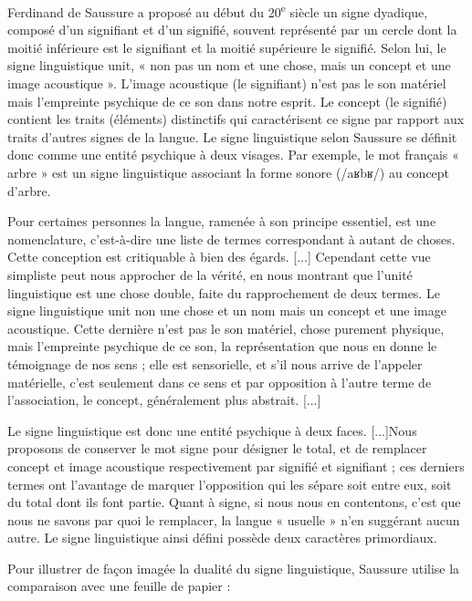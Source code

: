 Ferdinand de Saussure a proposé au début du 20\textsuperscript{e} siècle un signe dyadique, composé d’un signifiant et d’un signifié, souvent représenté par un cercle dont la moitié inférieure est le signifiant et la moitié supérieure le signifié. Selon lui, le signe linguistique unit, « non pas un nom et une chose, mais un concept et une image acoustique ». L’image acoustique (le signifiant) n’est pas le son matériel mais l’empreinte psychique de ce son dans notre esprit. Le concept (le signifié) contient
 les traits (éléments) distinctifs qui caractérisent ce signe par rapport aux traits d’autres signes de la langue. Le signe linguistique selon Saussure se définit donc comme une entité psychique à deux visages. Par exemple, le mot français « arbre » est un signe linguistique associant la forme sonore ({\BBSixGreek /aʁbʁ/}) au concept d’arbre.
\begin{lecture}{}
Pour certaines personnes la langue, ramenée à son principe essentiel, est une nomenclature, c’est-à-dire une liste de termes correspondant à autant de choses. Cette conception est critiquable à bien des égards. [...] Cependant cette vue simpliste peut nous approcher de la vérité, en nous montrant que l’unité linguistique est une chose double, faite du rapprochement de deux termes. Le signe linguistique unit non une chose et un nom mais un concept et une image acoustique. Cette dernière n’est pas le son matériel, chose purement physique, mais l’empreinte psychique de ce son, la représentation que nous en donne le témoignage de nos sens ; elle est sensorielle, et s’il nous arrive de l’appeler matérielle, c’est seulement dans ce sens et par opposition à l’autre terme de l’association, le concept, généralement plus abstrait. [...]

Le signe linguistique est donc une entité psychique à deux faces. [...]Nous proposons de conserver le mot signe pour désigner le total, et de remplacer concept et image acoustique respectivement par signifié et signifiant ; ces derniers termes ont l’avantage de marquer l’opposition qui les sépare soit entre eux, soit du total dont ils font partie. Quant à signe, si nous nous en contentons, c’est que nous ne savons par quoi le remplacer, la langue « usuelle » n’en suggérant aucun autre. Le signe linguistique ainsi défini possède deux caractères primordiaux.
\end{lecture}
Pour illustrer de façon imagée la dualité du signe linguistique, Saussure utilise la comparaison avec une feuille de papier :
